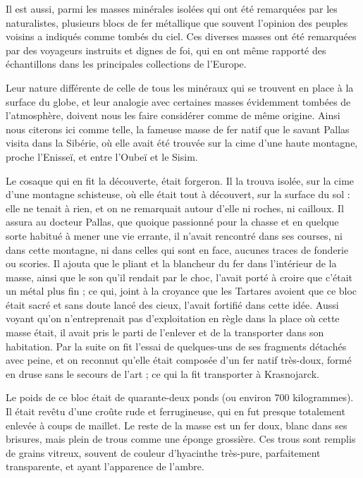 \documentclass[a4paper, 12pt, oneside, french]{article}
\begin{document}
Il est aussi, parmi les masses minérales isolées qui ont été remarquées par les naturalistes, plusieurs blocs de fer métallique que souvent l'opinion des peuples voisins a indiqués comme tombés du ciel. Ces diverses masses ont été remarquées par des voyageurs instruits et dignes de foi, qui en ont même rapporté des échantillons dans les principales collections de l'Europe.

Leur nature différente de celle de tous les minéraux qui se trouvent en place à la surface du globe, et leur analogie avec certaines masses évidemment tombées de l'atmosphère, doivent nous les faire considérer comme de même origine. Ainsi nous citerons ici comme telle, la fameuse masse de fer natif que le savant Pallas visita dans la Sibérie, où elle avait été trouvée sur la cime d'une haute montagne, proche l'Enisseï, et entre l'Oubeï et le Sisim.

Le cosaque qui en fit la découverte, était forgeron. Il la trouva isolée, sur la cime d'une montagne schisteuse, où elle était tout à découvert, sur la surface du sol : elle ne tenait à rien, et on ne remarquait autour d'elle ni roches, ni cailloux. Il assura au docteur Pallas, que quoique passionné pour la chasse et en quelque sorte habitué à mener une vie errante, il n'avait rencontré dans ses courses, ni dans cette montagne, ni dans celles qui sont en face, aucunes traces de fonderie ou scories. Il ajouta que le pliant et la blancheur du fer dans l'intérieur de la masse, ainsi que le son qu'il rendait par le choc, l'avait porté à croire que c'était un métal plus fin ; ce qui, joint à la croyance que les Tartares avoient que ce bloc était sacré et sans doute lancé des cieux, l'avait fortifié dans cette idée. Aussi voyant qu'on n'entreprenait pas d'exploitation en règle dans la place où cette masse était, il avait pris le parti de l'enlever et de la transporter dans son habitation. Par la suite on fit l'essai de quelques-uns de ses fragments détachés avec peine, et on reconnut qu'elle était composée d'un fer natif très-doux, formé en druse sans le secours de l'art ; ce qui la fit transporter à Krasnojarck.

Le poids de ce bloc était de quarante-deux ponds (ou environ 700 kilogrammes). Il était revêtu d'une croûte rude et ferrugineuse, qui en fut presque totalement enlevée à coups de maillet. Le reste de la masse est un fer doux, blanc dans ses brisures, mais plein de trous comme une éponge grossière. Ces trous sont remplis de grains vitreux, souvent de couleur d'hyacinthe très-pure, parfaitement transparente, et ayant l'apparence de l'ambre.
\end{document}
